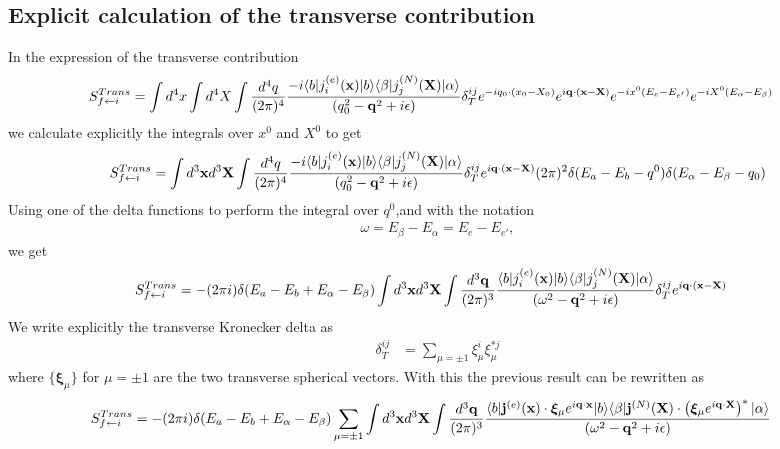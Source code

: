 \subsection{Explicit calculation of the transverse contribution}
In the expression of the transverse contribution
\begin{align}
    S_{f\leftarrow i}^{Trans} & = \int d^4x\int d^4 X \int \frac{d^4 q}{(2\pi)^4} \frac{-i\langle b| j^{(e)}_{i} ({\bf x}) |b\rangle  \langle \beta| j^{(N)}_{j}({\bf X})  |\alpha\rangle}{(q_0^2 -{\bf q}^2+ i\epsilon)}\delta^{ij}_T e^{-i q_0 \cdot (x_0 - X_0)} e^{i{\bf q}\cdot({\bf x} - {\bf X})} e^{-ix^0(E_e-E_{e'})}e^{-iX^0(E_\alpha-E_{\beta})}
\end{align}
we calculate explicitly the integrals over $x^0$ and $X^0$ to get
\begin{align}
    S_{f\leftarrow i}^{Trans}=\int d^3{\bf x} d^3{\bf X} \int \frac{d^4 q}{(2\pi)^4} \frac{-i\langle b| j^{(e)}_{i} ({\bf x}) |b\rangle  \langle \beta| j^{(N)}_{j}({\bf X})  |\alpha\rangle}{(q_0^2 -{\bf q}^2+ i\epsilon)}\delta^{ij}_T e^{i{\bf q}\cdot({\bf x} - {\bf X})}(2\pi)^2\delta(E_a-E_{b}-q^0)\delta(E_\alpha-E_{\beta}-q_0)
\end{align}
Using one of the delta functions to perform the integral over $q^0$,and with the notation
\begin{align}
    \omega = E_\beta - E_\alpha = E_e - E_{e'},
\end{align} we get
\begin{align}
    S_{f\leftarrow i}^{Trans} & = -(2\pi i)\delta(E_a-E_{b}+E_\alpha-E_{\beta})\int d^3{\bf x} d^3{\bf X} \int \frac{d^3 {\bf q}}{(2\pi)^3} \frac{\langle b| j^{(e)}_{i}({\bf x}) |b\rangle  \langle \beta| j^{(N)}_{j}({\bf X})  |\alpha\rangle}{(\omega^2 -{ \bf q}^2+ i\epsilon)}\delta^{ij}_T e^{i{\bf q}\cdot({\bf x} - {\bf X})}
\end{align}
We write explicitly the transverse Kronecker delta as
\begin{align}
    \delta^{ij}_T & =\sum\limits_{\mu = \pm1} \xi^{i}_{\mu} \xi^{*j}_{\mu}
\end{align}
where $\{\pmb{\xi}_{\mu}\}$ for $\mu = \pm 1$ are the two transverse spherical vectors.
With this the previous result can be rewritten as
\begin{align}
    S_{f\leftarrow i}^{Trans} & = -(2\pi i)\delta(E_a-E_{b}+E_\alpha-E_{\beta})\sum\limits_{\mu = \pm1} \int d^3{\bf x} d^3{\bf X} \int \frac{d^3 {\bf q}}{(2\pi)^3} \frac{\langle b| {\bf j}^{(e)}({\bf x})\cdot{\boldsymbol\xi}_{\mu}e^{i{\bf q}\cdot{\bf x}} |b\rangle  \langle \beta| {\bf j}^{(N)}({\bf X}) \cdot \left({\boldsymbol\xi}_{\mu} e^{i{\bf q}\cdot{\bf X}}\right)^*|\alpha\rangle}{(\omega^2 -{ \bf q}^2+ i\epsilon)}
\end{align}

